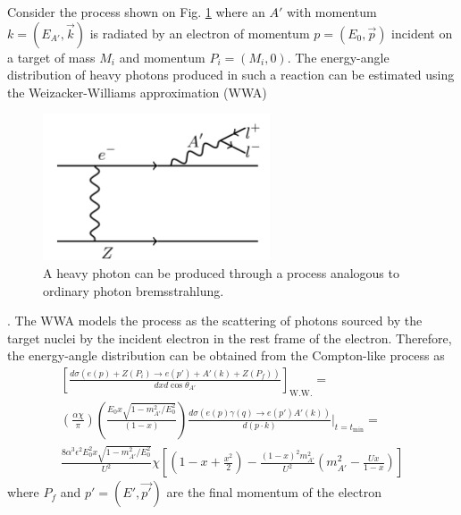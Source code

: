 Consider the process shown on Fig. \ref{fig:ap_production} where an $A'$ with
momentum $k = (E_{A'}, \vec{k})$ is radiated by an electron of momentum 
$p = (E_0, \vec{p})$ incident on a target of mass $M_i$ and momentum 
$P_i = (M_i, 0)$. The energy-angle distribution of heavy photons produced in 
such a reaction can be estimated using the Weizacker-Williams approximation (WWA)
\begin{figure}[t]
    \centering
    \includegraphics[width=0.6\textwidth]{images/aprime_brem.png}
    \caption{A heavy photon can be produced through a process analogous to 
             ordinary photon bremsstrahlung.}
    \label{fig:ap_production}
\end{figure}  
\cite{Bjorken:2009mm, Tsai:1986tx, Tsai:1973py, Kim:1973he}.
The WWA models the process as the scattering of photons sourced by the target 
nuclei by the incident electron
in the rest frame of the electron.  Therefore, the energy-angle distribution
can be obtained from the Compton-like process as
\begin{equation}
    \begin{split}
        \left[ \frac{d\sigma(e(p) + Z(P_i) \rightarrow e(p') + A'(k) + Z(P_f))}{dx d\cos\theta_{A'}} \right]_{\text{W.W.}} = \\
        \left( \frac{\alpha \chi}{\pi} \right) \left(\frac{E_0 x \sqrt{ 1 - m_{A'}^2/E_0^2}}{(1 - x)} \right) 
        \frac{d\sigma(e(p)\gamma(q) \rightarrow e(p') A'(k))}{d(p \cdot k)} |_{t = t_{\text{min}}} = \\
    \frac{8 \alpha^{3} \epsilon^{2} E_{0}^2 x \sqrt{1-m_{A'}^{2}/E_{0}^{2}}}{U^{2}} \chi
    \left [ \left (1 - x + \frac{x^{2}}{2} \right )  - \frac{(1-x)^{2} m_{A'}^{2}}{U^{2}}
    \left(m_{A'}^{2} - \frac{Ux}{1-x} \right) \right]
    \end{split}
    \label{eqn:ap_diff_cross}
\end{equation}
where $P_f$ and $p' = (E', \vec{p'})$ are the final momentum of the electron
